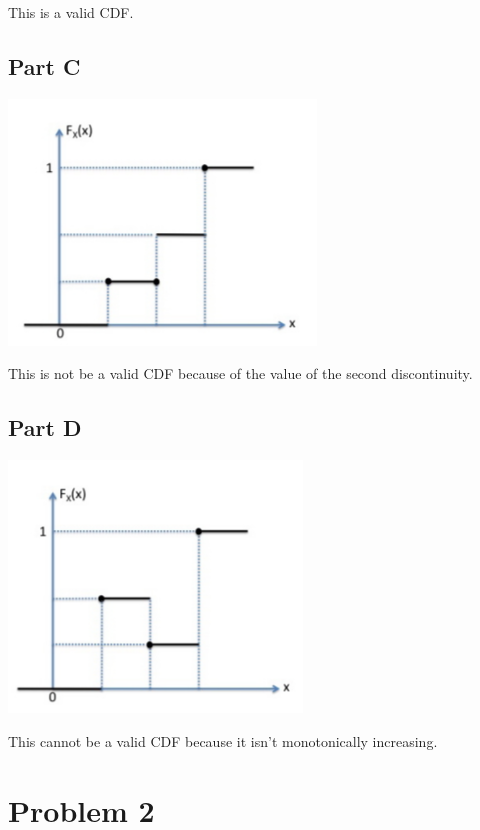 \documentclass{article}
\begin{document}
This is a valid CDF.

\subsection*{Part C}

\begin{center}
    \includegraphics[scale=1]{Images/P1C.PNG}
\end{center}

This is not be a valid CDF because of the value of the second discontinuity.

\subsection*{Part D}

\begin{center}
    \includegraphics[scale=1]{Images/P1D.PNG}
\end{center}

This cannot be a valid CDF because it isn't monotonically increasing.

\section*{Problem 2}
\end{document}
